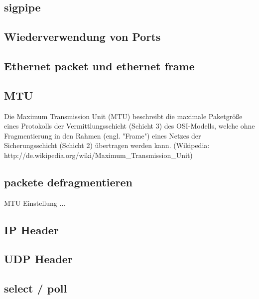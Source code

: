 \subsection{sigpipe}


\subsection{Wiederverwendung von Ports}

\subsection{Ethernet packet und ethernet frame}

\subsection{MTU}
Die Maximum Transmission Unit (MTU) beschreibt die maximale Paketgröße eines Protokolls der Vermittlungsschicht (Schicht 3) des OSI-Modells, welche ohne Fragmentierung in den Rahmen (engl. "Frame") eines Netzes der Sicherungsschicht (Schicht 2) übertragen werden kann. (Wikipedia: http://de.wikipedia.org/wiki/Maximum\_Transmission\_Unit)

\subsection{packete defragmentieren}
MTU Einstellung ...

\subsection{IP Header}

\subsection{UDP Header}

\subsection{select / poll}